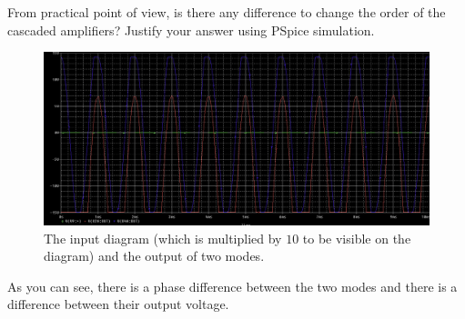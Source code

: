 \documentclass[11pt]{article}
\begin{document}
\begin{question}
\begin{subquestion}{From practical point of view, is there any difference to change the order of the cascaded amplifiers? Justify your answer using PSpice simulation.}
{\begin{figure}[H]
            \end{figure}
            \begin{figure}[H]
                \centering
                \includegraphics[scale=0.25,angle=0]{Fig/Q6b.png}
                \caption{The input diagram (which is multiplied by $10$ to be visible on the diagram) and the output of two modes.}
            \end{figure}
            As you can see, there is a phase difference between the two modes and there is a difference between their output voltage.
        }
    \end{subquestion}

\end{question}
\end{document}
